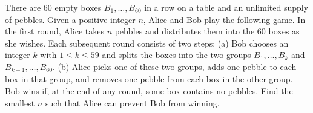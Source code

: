 There are 60 empty boxes $B_1,\ldots,B_{60}$ in a row on a table and an unlimited supply of pebbles. Given a positive integer $n$, Alice and Bob play the following game.
In the first round, Alice takes $n$ pebbles and distributes them into the 60 boxes as she wishes. Each subsequent round consists of two steps:
(a) Bob chooses an integer $k$ with $1\leq k\leq 59$ and splits the boxes into the two groups $B_1,\ldots,B_k$ and $B_{k+1},\ldots,B_{60}$.
(b) Alice picks one of these two groups, adds one pebble to each box in that group, and removes one pebble from each box in the other group.
Bob wins if, at the end of any round, some box contains no pebbles. Find the smallest $n$ such that Alice can prevent Bob from winning.
